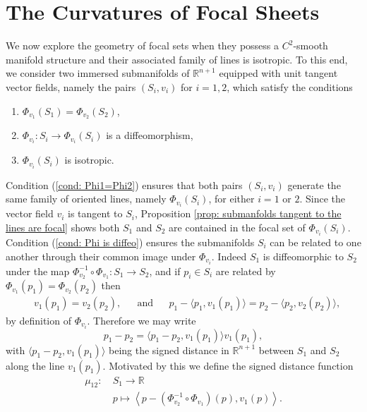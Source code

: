 \documentclass[12pt]{amsart}
\theoremstyle{plain}
\theoremstyle{definition}
\def\R{\mathbb{R}}
\numberwithin{equation}{section}
\begin{document}
\section{The Curvatures of Focal Sheets}\label{sec: The Curvature of Focal Sets}
We now explore the geometry of focal sets when they possess a $C^2$-smooth manifold structure and their associated family of lines is isotropic. To this end, we consider two immersed submanifolds of $\R^{n+1}$ equipped with unit tangent vector fields, namely the pairs $(S_i,v_i)$ for $i=1,2$, which satisfy the conditions
\begin{enumerate}
    \item \label{cond: Phi1=Phi2} $\Phi_{v_1}(S_1)=\Phi_{v_2}(S_2)$,
    \item \label{cond: Phi is diffeo} $\Phi_{v_i}:S_i\to \Phi_{v_i}(S_i)$ is a diffeomorphism,
     \item \label{cond: Phi isotropic} $\Phi_{v_i}(S_i)$ is isotropic.
\end{enumerate}
Condition (\ref{cond: Phi1=Phi2}) ensures that both pairs $(S_i,v_i)$ generate the same family of oriented lines, namely $\Phi_{v_i}(S_i)$, for either $i=1$ or $2$. Since the vector field $v_i$ is tangent to $S_i$, Proposition \ref{prop: submanfolds tangent to the lines are focal} shows both $S_1$ and $S_2$ are contained in the focal set of $\Phi_{v_i}(S_i)$. Condition (\ref{cond: Phi is diffeo}) ensures the submanifolds $S_i$ can be related to one another through their common image under $\Phi_{v_i}$. Indeed $S_1$ is diffeomorphic to $S_2$ under the map $\Phi_{v_2}^{-1}\circ \Phi_{v_1}:S_1\to S_2$, and if $p_i\in S_i$ are related by $\Phi_{v_1}(p_1)=\Phi_{v_2}(p_2)$ then
\begin{align}\label{equ: equate images of Phi's}
    &v_1(p_1)=v_2(p_2), &&\text{and} &&p_1-\langle p_1,v_1(p_1)\rangle=p_2-\langle p_2,v_2(p_2)\rangle,
\end{align}
by definition of $\Phi_{v_i}$. Therefore we may write
\[
p_1-p_2=\langle p_1-p_2,v_1(p_1)\rangle v_1(p_1),
\]
with $\langle p_1-p_2,v_1(p_1)\rangle$ being the signed distance in $\mathbb{R}^{n+1}$ between $S_1$ and $S_2$ along the line $v_1(p_1)$. Motivated by this we define the signed distance function
\begin{equation}\label{equ: distance function}
\begin{aligned}
\mu_{12}:~ &S_1\to \mathbb{R}\\
&p\longmapsto  \left\langle p- (\Phi_{v_2}^{-1} \circ \Phi_{v_1})(p),v_1(p)\right\rangle.
\end{aligned}
\end{equation}
\end{document}
